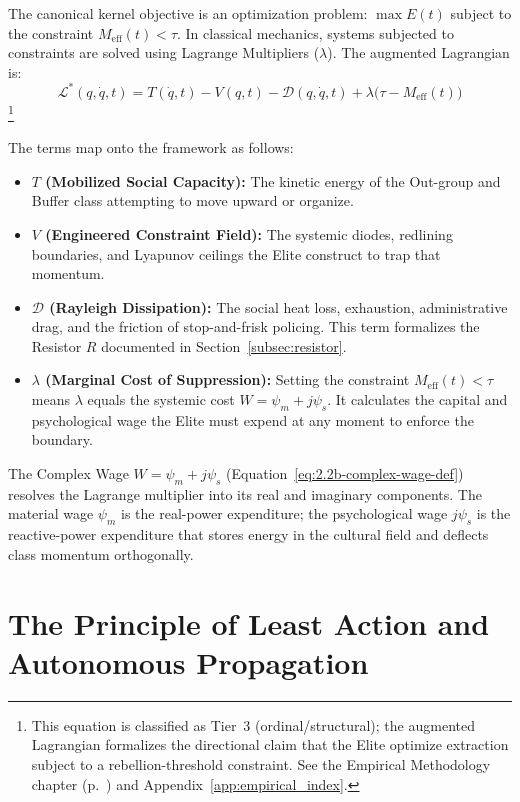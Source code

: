 The canonical kernel objective is an optimization problem: $\max E(t)$ subject to the constraint $M_{\text{eff}}(t) < \tau$. In classical mechanics, systems subjected to constraints are solved using Lagrange Multipliers ($\lambda$). The augmented Lagrangian is:
\begin{equation}\label{eq:lag-augmented}
\boxed{\mathcal{L}^*(q, \dot{q}, t) = T(\dot{q}, t) - V(q, t) - \mathcal{D}(q, \dot{q}, t) + \lambda\bigl(\tau - M_{\text{eff}}(t)\bigr)}
\end{equation}
\footnote{This equation is classified as Tier~3 (ordinal/structural); the augmented Lagrangian formalizes the directional claim that the Elite optimize extraction subject to a rebellion-threshold constraint. See the Empirical Methodology chapter (p.~\pageref{ch:empirical_methodology}) and Appendix~\ref{app:empirical_index}.}

The terms map onto the framework as follows:
\begin{itemize}
    \item \textbf{$T$ (Mobilized Social Capacity):} The kinetic energy of the Out-group and Buffer class attempting to move upward or organize.
    \item \textbf{$V$ (Engineered Constraint Field):} The systemic diodes, redlining boundaries, and Lyapunov ceilings the Elite construct to trap that momentum.
    \item \textbf{$\mathcal{D}$ (Rayleigh Dissipation):} The social heat loss, exhaustion, administrative drag, and the friction of stop-and-frisk policing. This term formalizes the Resistor $R$ documented in Section~\ref{subsec:resistor}.
    \item \textbf{$\lambda$ (Marginal Cost of Suppression):} Setting the constraint $M_{\text{eff}}(t) < \tau$ means $\lambda$ equals the systemic cost $W = \psi_m + j\psi_s$. It calculates the capital and psychological wage the Elite must expend at any moment to enforce the boundary.
\end{itemize}

The Complex Wage $W = \psi_m + j\psi_s$ (Equation~\ref{eq:2.2b-complex-wage-def}) resolves the Lagrange multiplier into its real and imaginary components. The material wage $\psi_m$ is the real-power expenditure; the psychological wage $j\psi_s$ is the reactive-power expenditure that stores energy in the cultural field and deflects class momentum orthogonally.

\section{The Principle of Least Action and Autonomous Propagation}

